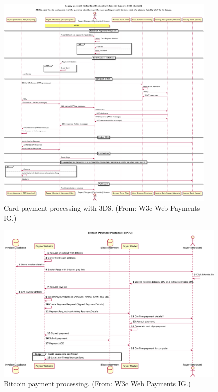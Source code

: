 \documentclass{IEEEtran}
\begin{document}
\begin{figure}
\begin{center}
\includegraphics[width=0.95\textwidth]{figs/cc3ds.pdf}
\end{center}
\caption{Card payment processing with 3DS. (From: W3c Web Payments IG.)}
\label{fig:cc3ds}
\end{figure}



\begin{figure}
\includegraphics[width=\textwidth]{figs/bitcoin.pdf}
\caption{Bitcoin payment processing. (From: W3c Web Payments IG.)}
\label{fig:bitcoin}
\end{figure}
\end{document}
